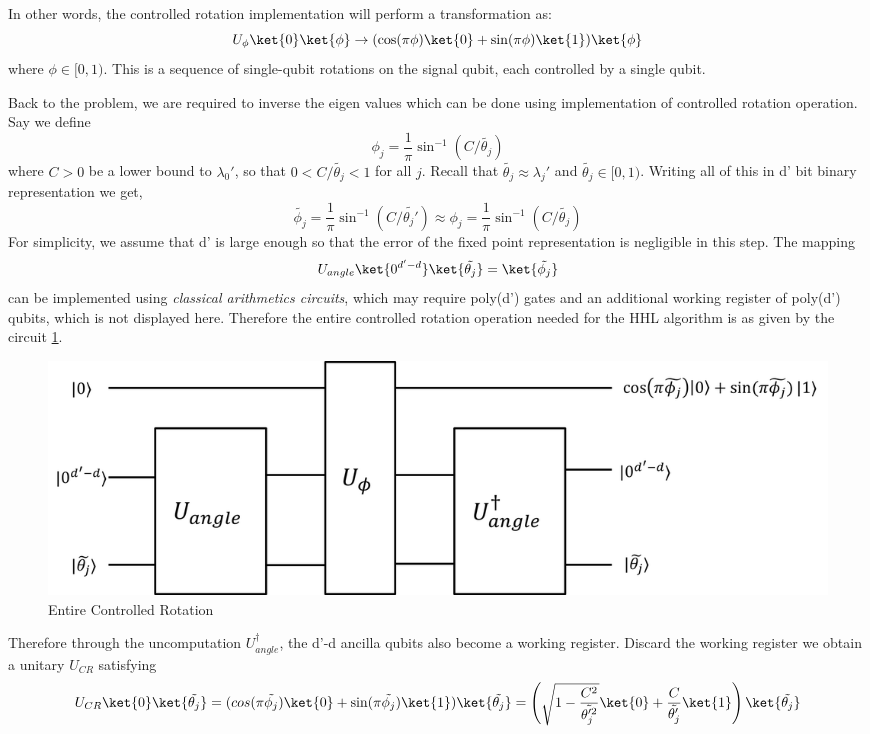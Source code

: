 \documentclass[12pt, oneside]{book}
\theoremstyle{definition}
\theoremstyle{definition}
\theoremstyle{remark}
\begin{document}
\begin{enumerate}
    In other words, the controlled rotation implementation will perform a transformation as:
    \[
    U_{\phi}\ket{0}\ket{\phi} \rightarrow (\cos (\pi\phi)\ket{0} + \sin (\pi\phi)\ket{1})\ket{\phi}
    \]
    where $\phi \in [0,1)$.
    This is a sequence of single-qubit rotations on the signal qubit, each controlled by a single qubit.

    Back to the problem, we are required to inverse the eigen values which can be done using implementation of controlled rotation operation. Say we define
    \[
    \phi_j=\frac{1}{\pi}\sin^{-1}(C/\tilde{\theta_j})
    \]
    where $C>0$ be a lower bound to $\lambda_0'$, so that $0<C/\tilde{\theta_j}<1$ for all $j$. Recall that $\tilde{\theta_j}\approx \lambda_j'$ and $\tilde{\theta_j} \in [0,1)$. Writing all of this in d' bit binary representation we get,
    \[
    \tilde{\phi_j}=\frac{1}{\pi}\sin^{-1}(C/\tilde{\theta_j'})\approx \phi_j= \frac{1}{\pi}\sin^{-1}(C/\tilde{\theta_j})
    \]
    For simplicity, we assume that d' is large enough so that the error of the fixed point representation is negligible in this step. The mapping
    \[
    U_{angle}\ket{0^{d'-d}}\ket{\tilde{\theta_j}}=\ket{\tilde{\phi_j}}
    \]
    can be implemented using \textit{classical arithmetics circuits}, which may require poly(d') gates and an additional working register of poly(d') qubits, which is not displayed here. Therefore the entire controlled rotation operation needed for the HHL algorithm is as given by the circuit \ref{fig:cr}.
    \begin{figure}
        \centering
        \includegraphics[width=\linewidth]{../images/Cr.png}
        \caption{Entire Controlled Rotation}
        \label{fig:cr}
    \end{figure}
    Therefore through the uncomputation $U_{angle}^{\dagger}$, the d'-d ancilla qubits also become a working register. Discard the working register we obtain a unitary $U_{CR}$ satisfying
    \[
    U_{CR}\ket{0}\ket{\tilde{\theta_j}}=(cos(\pi\tilde{\phi_j})\ket{0}+\sin (\pi\tilde{\phi_j})\ket{1})\ket{\tilde{\theta_j}}=\left(\sqrt{1-\frac{C^2}{\tilde{\theta'^2_j}}}\ket{0}+\frac{C}{\tilde{\theta_j'}}\ket{1}\right)\ket{\tilde{\theta_j}}
\]
\end{enumerate}
\end{document}
